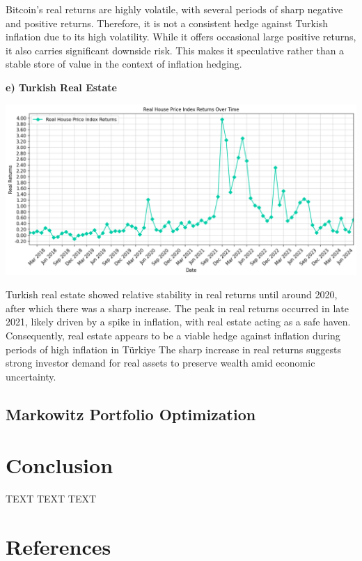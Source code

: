 \documentclass[
]{article}
\begin{document}
Bitcoin's real returns are highly volatile, with several periods of sharp negative and positive returns. Therefore, it is not a consistent hedge against Turkish inflation due to its high volatility. While it offers occasional large positive returns, it also carries significant downside risk. This makes it speculative rather than a stable store of value in the context of inflation hedging.

\textbf{e) Turkish Real Estate}

\includegraphics[width=\textwidth]{figures/real-returns-hpi.png}

Turkish real estate showed relative stability in real returns until around 2020, after which there was a sharp increase. The peak in real returns occurred in late 2021, likely driven by a spike in inflation, with real estate acting as a safe haven. Consequently, real estate appears to be a viable hedge against inflation during periods of high inflation in Türkiye The sharp increase in real returns suggests strong investor demand for real assets to preserve wealth amid economic uncertainty.

\subsection{Markowitz Portfolio Optimization}

\section{Conclusion}\label{conclusion}

TEXT TEXT TEXT

\pagebreak

\section{References}


\end{document}
